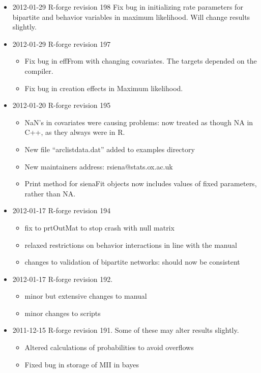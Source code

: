 \documentclass[a4paper,fleqn,11pt]{article}
\newcommand{\+}{\, + \,}
\begin{document}
{\begin{small}
\begin{itemize}
\begin{itemize}
\item Siena07 now stops if cannot get a derivative matrix in phase 1.
\end{itemize}
\item 2012-01-29 R-forge revision 198
Fix bug in initializing rate parameters for bipartite and behavior variables in
maximum likelihood. Will change results slightly.
\item 2012-01-29 R-forge revision 197
\begin{itemize}
\item Fix bug in effFrom with changing covariates. The targets depended on the
compiler.
\item Fix bug in creation effects in Maximum likelihood.
\end{itemize}
\item 2012-01-20 R-forge revision 195
\begin{itemize}
\item NaN's in covariates were causing problems: now treated as though NA in C++,
  as they always were in R.
\item New file ``arclistdata.dat'' added to examples directory
\item New maintainers address: rsiena@stats.ox.ac.uk
\item Print method for sienaFit objects now includes values of fixed parameters,
  rather than NA.
\end{itemize}
\item 2012-01-17 R-forge revision 194
\begin{itemize}
\item fix to prtOutMat to stop crash with null matrix
\item relaxed restrictions on behavior interactions in line with the manual
\item changes to validation of bipartite networks: should now be consistent
\end{itemize}
\item 2012-01-17 R-forge revision 192.
\begin{itemize}
\item minor but extensive changes to manual
\item minor changes to scripts
\end{itemize}
\item 2011-12-15 R-forge revision 191. Some of these may alter results slightly.
\begin{itemize}
\item Altered calculations of probabilities to avoid overflows
\item Fixed bug in storage of MII in bayes

\end{itemize}
\end{itemize}
\end{small}}
\end{document}
